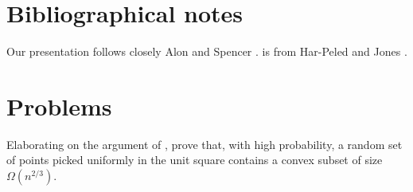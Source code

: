 
\section{Bibliographical notes}

Our presentation follows closely Alon and Spencer \cite{as-pm-00}.
 is from Har-Peled and Jones \cite{hj-spl-18}.

\section{Problems}
\begin{exercise}
    Elaborating on the argument of , prove that,
    with high probability, a random set of points picked uniformly in
    the unit square contains a convex subset of size
    $\Omega(n^{2/3})$.
\end{exercise}





\ChapterEnd{}

